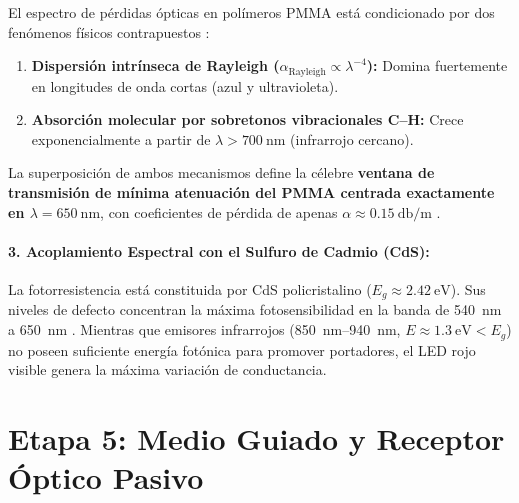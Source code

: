 \documentclass[11pt,letterpaper]{article}
\begin{document}
El espectro de pérdidas ópticas en polímeros PMMA está condicionado por dos fenómenos físicos contrapuestos \cite{ziemann2008}:
\begin{enumerate}
    \item \textbf{Dispersión intrínseca de Rayleigh ($\alpha_{\text{Rayleigh}} \propto \lambda^{-4}$):} Domina fuertemente en longitudes de onda cortas (azul y ultravioleta).
    \item \textbf{Absorción molecular por sobretonos vibracionales C--H:} Crece exponencialmente a partir de $\lambda > \SI{700}{\nano\meter}$ (infrarrojo cercano).
\end{enumerate}
La superposición de ambos mecanismos define la célebre \textbf{ventana de transmisión de mínima atenuación del PMMA centrada exactamente en $\lambda = \SI{650}{\nano\meter}$}, con coeficientes de pérdida de apenas $\alpha \approx \SI{0.15}{\decibel\per\meter}$ \cite{ziemann2008}.

\paragraph{3. Acoplamiento Espectral con el Sulfuro de Cadmio (CdS):}
La fotorresistencia está constituida por CdS policristalino ($E_g \approx \SI{2.42}{\electronvolt}$). Sus niveles de defecto concentran la máxima fotosensibilidad en la banda de \SI{540}{\nano\meter} a \SI{650}{\nano\meter} \cite{rose1963,streetman2016}. Mientras que emisores infrarrojos (\SI{850}{\nano\meter}--\SI{940}{\nano\meter}, $E \approx \SI{1.3}{\electronvolt} < E_g$) no poseen suficiente energía fotónica para promover portadores, el LED rojo visible genera la máxima variación de conductancia.

\section{Etapa 5: Medio Guiado y Receptor Óptico Pasivo}
\end{document}

